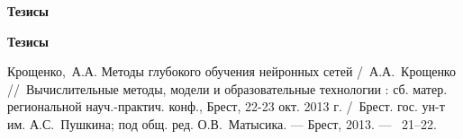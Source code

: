 


\ifx\isabstract\undefined 
\begin{center}
\vspace{3mm}
{\bf Тезисы}
\vspace{3mm}
\end{center}
\else
\vspace{2mm}
{\bf Тезисы}
\vspace{2mm}
\fi

Крощенко,~А.А. Методы глубокого обучения нейронных сетей /~А.А.~Крощенко
\newblock //~Вычислительные методы, модели и образовательные технологии : сб. матер. региональной науч.-практич. конф., Брест, 22-23 окт. 2013 г.
\newblock /~Брест. гос. ун-т им. А.С.~Пушкина; под общ. ред. О.В.~Матысика. ---
\newblock Брест, 2013. ---
~21--22.


